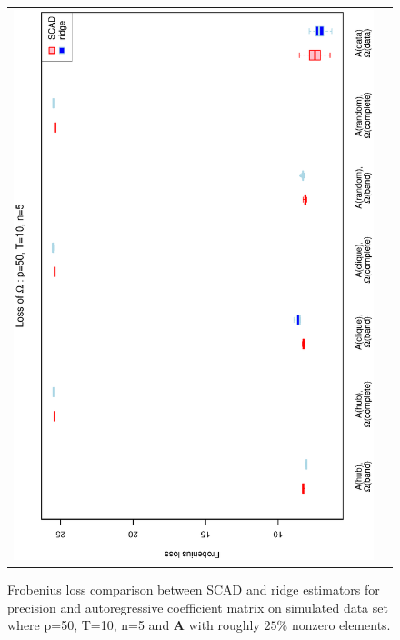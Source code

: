 \documentclass[a4paper]{article}
\begin{document}
\begin{figure}[h!]
\begin{tabular}{cc}
\includegraphics[scale=0.45,angle=270]{LossOmega50T10N5_25.eps}
\end{tabular}
\caption{Frobenius loss comparison between SCAD and ridge estimators for precision and autoregressive coefficient matrix on simulated data set where p=50, T=10, n=5 and $\mathbf{A}$ with roughly $25\%$ nonzero elements.}
\label{figSM:Loss50T10N5_25}
\end{figure}

\end{document}
